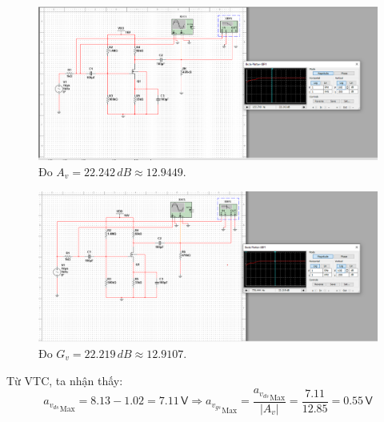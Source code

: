 \begin{figure}[H]
	\centering
	\includegraphics[width=\linewidth]{./my-chapters/my-images/Question1/Câu 1 Hình 1 b - Av.png}
	\caption{Đo $A_{v} = 22.242\,dB \approx 12.9449$.}
\end{figure}

\begin{figure}[H]
	\centering
	\includegraphics[width=\linewidth]{./my-chapters/my-images/Question1/Câu 1 Hình 1 b - Gv.png}
	\caption{Đo $G_{v} = 22.219\, dB \approx 12.9107$.}
\end{figure}
Từ VTC, ta nhận thấy:
\[
{a_{v_{ds}}}_{\text{Max}}=8.13-1.02=7.11\,\textsf{V}
\Rightarrow {a_{v_{gs}}}_{\text{Max}}=\frac{{a_{v_{ds}}}_{\text{Max}}}{\left|A_{v}\right|}=\frac{7.11}{12.85}=0.55\,\textsf{V}
\]

